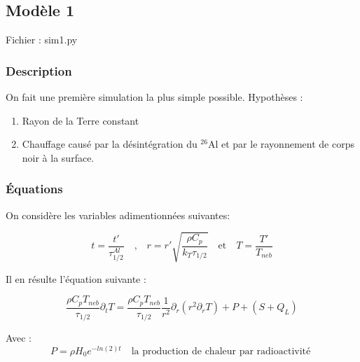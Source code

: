 \documentclass[10pt,a4paper]{article}
\numberwithin{equation}{section}
\begin{document}
\subsection{Modèle 1}

Fichier : sim1.py

\subsubsection{Description}

On fait une première simulation la plus simple possible.
Hypothèses : 
\begin{enumerate}
\item Rayon de la Terre constant 
\item Chauffage causé par la désintégration du $^{26}$Al et par le rayonnement de corps noir à la surface.
\end{enumerate}



\subsubsection{Équations}

On considère les variables adimentionnées suivantes: 


\begin{equation}
t= \frac{t'}{\tau^{Al}_{1/2}}  \quad \textrm{,} \quad   r = r' \sqrt{\frac{\rho C_p} {k_T \tau_{1/2}}} \quad  \textrm{et} \quad T = \frac{T'}{T_{neb}} 
\end{equation}

Il en résulte l'équation suivante :


\begin{equation}
\frac{\rho C_p T_{neb}}{\tau_{1/2}} \partial_{t} T = \frac{\rho C_p T_{neb}}{\tau_{1/2}} \frac{1}{r^2} \partial_{r} ( {r}^2 \partial_{r} T)  + P +( S + Q_L)
\end{equation}


Avec :
\begin{equation}
 P = \rho H_0 e^{-ln(2) t} \quad \textrm{la production de chaleur par radioactivité }
\end{equation}
\end{document}
